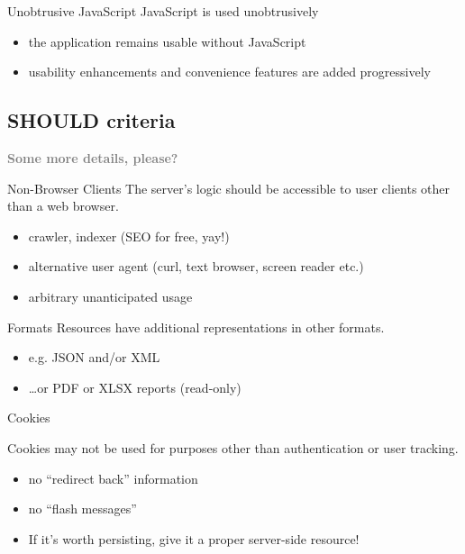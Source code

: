 \documentclass{beamer}
\begin{document}
\begin{frame}{Unobtrusive JavaScript}
  JavaScript is used unobtrusively

  \begin{itemize}
    \item the application remains usable without JavaScript
    \item usability enhancements and convenience features are added progressively
  \end{itemize}
\end{frame}

\subsection{SHOULD criteria}

\begin{frame}
  \vspace*{-1cm}
  \textcolor{gray}{
    \begin{center}
      \textbf{
        \fontsize{60}{50}\selectfont Some more details, please?
      }
    \end{center}
  }
\end{frame}

\begin{frame}{Non-Browser Clients}
  The server's logic should be accessible to user clients other than a web browser.

  \begin{itemize}
    \item crawler, indexer (SEO for free, yay!)
    \item alternative user agent (curl, text browser, screen reader etc.)
    \item arbitrary unanticipated usage
  \end{itemize}
\end{frame}

\begin{frame}{Formats}
  Resources have additional representations in other formats.

  \begin{itemize}
    \item e.g. JSON and/or XML
    \item \dots or PDF or XLSX reports (read-only)
  \end{itemize}
\end{frame}

\begin{frame}{Cookies}

  Cookies may not be used for purposes other than authentication or user tracking.

  \begin{itemize}
    \item no ``redirect back'' information
    \item no ``flash messages''
    \item If it's worth persisting, give it a proper server-side resource!
  \end{itemize}
\end{frame}
\end{document}
